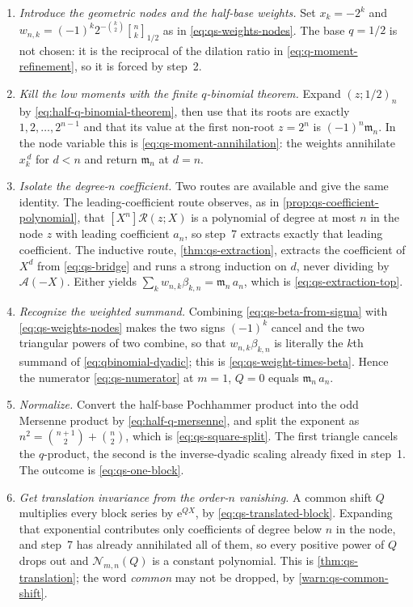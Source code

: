 \documentclass[11pt,oneside]{article}
\theoremstyle{definition}
\theoremstyle{remark}
\newcommand{\e}{\mathrm e}
\newcommand{\qbinom}[3]{\genfrac{[}{]}{0pt}{}{#1}{#2}_{#3}}
\begin{document}
\begin{enumerate}
\item \emph{Introduce the geometric nodes and the half-base weights.}  Set $x_k=-2^k$ and
$w_{n,k}=(-1)^k2^{-\binom k2}\qbinom nk{1/2}$ as in \eqref{eq:qs-weights-nodes}.  The base
$q=1/2$ is not chosen: it is the reciprocal of the dilation ratio in
\eqref{eq:q-moment-refinement}, so it is forced by step~2.

\item \emph{Kill the low moments with the finite $q$-binomial theorem.}  Expand
$(z;1/2)_n$ by \eqref{eq:half-q-binomial-theorem}, then use that its roots are exactly
$1,2,\ldots,2^{n-1}$ and that its value at the first non-root $z=2^n$ is
$(-1)^n\mathfrak m_n$.  In the node variable this is
\eqref{eq:qs-moment-annihilation}: the weights annihilate $x_k^{\,d}$ for $d<n$ and return
$\mathfrak m_n$ at $d=n$.

\item \emph{Isolate the degree-$n$ coefficient.}  Two routes are available and give the same
identity.  The leading-coefficient route observes, as in
\cref{prop:qs-coefficient-polynomial}, that $[X^n]\mathscr R(z;X)$ is a polynomial of degree
at most $n$ in the node $z$ with leading coefficient $a_n$, so step~7 extracts exactly that
leading coefficient.  The inductive route, \cref{thm:qs-extraction}, extracts the
coefficient of $X^d$ from \eqref{eq:qs-bridge} and runs a strong induction on $d$, never
dividing by $\mathscr A(-X)$.  Either yields
$\sum_{k}w_{n,k}\beta_{k,n}=\mathfrak m_n\,a_n$, which is \eqref{eq:qs-extraction-top}.

\item \emph{Recognize the weighted summand.}  Combining
\eqref{eq:qs-beta-from-sigma} with \eqref{eq:qs-weights-nodes} makes the two signs
$(-1)^k$ cancel and the two triangular powers of two combine, so that
$w_{n,k}\beta_{k,n}$ is literally the $k$th summand of \eqref{eq:qbinomial-dyadic}; this is
\eqref{eq:qs-weight-times-beta}.  Hence the numerator \eqref{eq:qs-numerator} at $m=1$,
$Q=0$ equals $\mathfrak m_n\,a_n$.

\item \emph{Normalize.}  Convert the half-base Pochhammer product into the odd Mersenne
product by \eqref{eq:half-q-mersenne}, and split the exponent as
$n^2=\binom{n+1}2+\binom n2$, which is \eqref{eq:qs-square-split}.  The first triangle
cancels the $q$-product, the second is the inverse-dyadic scaling already fixed in step~1.
The outcome is \eqref{eq:qs-one-block}.

\item \emph{Get translation invariance from the order-$n$ vanishing.}  A common shift $Q$
multiplies every block series by $\e^{QX}$, by \eqref{eq:qs-translated-block}.  Expanding
that exponential contributes only coefficients of degree below $n$ in the node, and step~7
has already annihilated all of them, so every positive power of $Q$ drops out and
$\mathcal N_{m,n}(Q)$ is a constant polynomial.  This is \cref{thm:qs-translation}; the word
\emph{common} may not be dropped, by \cref{warn:qs-common-shift}.


\end{enumerate}
\end{document}
